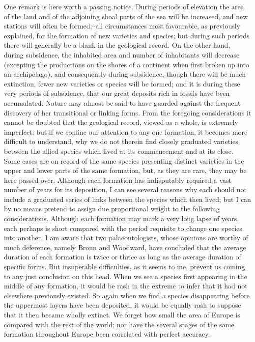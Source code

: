 One remark is here worth a passing notice. During periods of elevation the area of the land and of the adjoining shoal parts of the sea will be increased, and new stations will often be formed;--all circumstances most favourable, as previously explained, for the formation of new varieties and species; but during such periods there will generally be a blank in the geological record. On the other hand, during subsidence, the inhabited area and number of inhabitants will decrease (excepting the productions on the shores of a continent when first broken up into an archipelago), and consequently during subsidence, though there will be much extinction, fewer new varieties or species will be formed; and it is during these very periods of subsidence, that our great deposits rich in fossils have been accumulated. Nature may almost be said to have guarded against the frequent discovery of her transitional or linking forms.
From the foregoing considerations it cannot be doubted that the geological record, viewed as a whole, is extremely imperfect; but if we confine our attention to any one formation, it becomes more difficult to understand, why we do not therein find closely graduated varieties between the allied species which lived at its commencement and at its close. Some cases are on record of the same species presenting distinct varieties in the upper and lower parts of the same formation, but, as they are rare, they may be here passed over. Although each formation has indisputably required a vast number of years for its deposition, I can see several reasons why each should not include a graduated series of links between the species which then lived; but I can by no means pretend to assign due proportional weight to the following considerations.
Although each formation may mark a very long lapse of years, each perhaps is short compared with the period requisite to change one species into another. I am aware that two palaeontologists, whose opinions are worthy of much deference, namely Bronn and Woodward, have concluded that the average duration of each formation is twice or thrice as long as the average duration of specific forms. But insuperable difficulties, as it seems to me, prevent us coming to any just conclusion on this head. When we see a species first appearing in the middle of any formation, it would be rash in the extreme to infer that it had not elsewhere previously existed. So again when we find a species disappearing before the uppermost layers have been deposited, it would be equally rash to suppose that it then became wholly extinct. We forget how small the area of Europe is compared with the rest of the world; nor have the several stages of the same formation throughout Europe been correlated with perfect accuracy.
